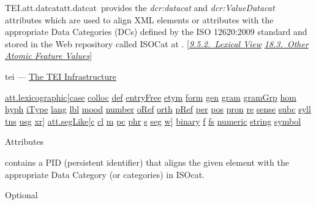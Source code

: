 \begin{reflist}
\item[]\begin{specHead}{TEI.att.datcat}{att.datcat} provides the {\itshape dcr:datacat} and {\itshape dcr:ValueDatacat} attributes which are used to align XML elements or attributes with the appropriate Data Categories (DCs) defined by the ISO 12620:2009 standard and stored in the Web repository called ISOCat at . [\textit{\hyperref[DIMVLV]{9.5.2.\ Lexical View}} \textit{\hyperref[FSSY]{18.3.\ Other Atomic Feature Values}}]\end{specHead} 
    \item[{Module}]
  tei — \hyperref[ST]{The TEI Infrastructure}
    \item[{Members}]
  \hyperref[TEI.att.lexicographic]{att.lexicographic}[\hyperref[TEI.case]{case} \hyperref[TEI.colloc]{colloc} \hyperref[TEI.def]{def} \hyperref[TEI.entryFree]{entryFree} \hyperref[TEI.etym]{etym} \hyperref[TEI.form]{form} \hyperref[TEI.gen]{gen} \hyperref[TEI.gram]{gram} \hyperref[TEI.gramGrp]{gramGrp} \hyperref[TEI.hom]{hom} \hyperref[TEI.hyph]{hyph} \hyperref[TEI.iType]{iType} \hyperref[TEI.lang]{lang} \hyperref[TEI.lbl]{lbl} \hyperref[TEI.mood]{mood} \hyperref[TEI.number]{number} \hyperref[TEI.oRef]{oRef} \hyperref[TEI.orth]{orth} \hyperref[TEI.pRef]{pRef} \hyperref[TEI.per]{per} \hyperref[TEI.pos]{pos} \hyperref[TEI.pron]{pron} \hyperref[TEI.re]{re} \hyperref[TEI.sense]{sense} \hyperref[TEI.subc]{subc} \hyperref[TEI.syll]{syll} \hyperref[TEI.tns]{tns} \hyperref[TEI.usg]{usg} \hyperref[TEI.xr]{xr}] \hyperref[TEI.att.segLike]{att.segLike}[\hyperref[TEI.c]{c} \hyperref[TEI.cl]{cl} \hyperref[TEI.m]{m} \hyperref[TEI.pc]{pc} \hyperref[TEI.phr]{phr} \hyperref[TEI.s]{s} \hyperref[TEI.seg]{seg} \hyperref[TEI.w]{w}] \hyperref[TEI.binary]{binary} \hyperref[TEI.f]{f} \hyperref[TEI.fs]{fs} \hyperref[TEI.numeric]{numeric} \hyperref[TEI.string]{string} \hyperref[TEI.symbol]{symbol}
    \item[{Attributes}]
  Attributes\hfil\\[-10pt]\begin{sansreflist}
    \item[@datcat]
  contains a PID (persistent identifier) that aligns the given element with the appropriate Data Category (or categories) in ISOcat.
\begin{reflist}
    \item[{Status}]
  Optional
    \item[{Datatype}]

\end{reflist}
\end{sansreflist}
\end{reflist}
